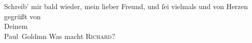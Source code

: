 \begin{ledgroupsized}[t]{13cm}
           \pstart
           Schreib’ mir bald wieder, {\pb}mein lieber Freund, und
               ſei vielmals und von Herzen gegrüßt von {\\}Deinem {\\}\spacefill\mbox{Paul Goldmn}\pend
           \pstart
           \noindent{}Was macht \textsc{Richard}?\pend
           
         
         \endnumbering{}\end{ledgroupsized}\begin{anhang}\end{anhang}\newcommand{\dateiname}{L03204}\newcommand{\titel}{Paul Goldmann an Arthur Schnitzler, 17. 4. [1902]}\newcommand{\editorInnen}{Martin Anton Müller und Laura Untner}
      